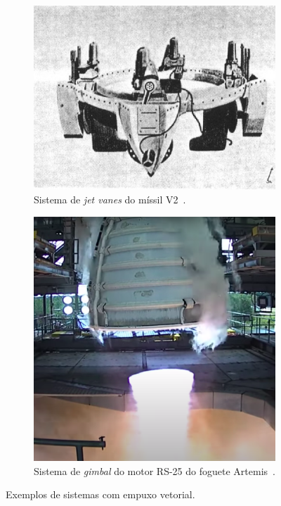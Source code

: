 \begin{figure}
    \centering
    \begin{subfigure}{.49\textwidth}
        \centering
        \includegraphics[width=.9\textwidth]{img/v2jetvanes.jpg}
        \caption{Sistema de \textit{jet vanes} do míssil V2~\cite{V2jetvanes}.}\label{fig:tvc_systems_jet_vanes}
    \end{subfigure}
    \hfill
    \begin{subfigure}{.49\textwidth}
        \centering
        \includegraphics[width=.9\textwidth]{img/engine_gimbal.png}
        \caption{Sistema de \textit{gimbal} do motor RS-25 do foguete Artemis~\cite{RS25Gimbal}.}\label{fig:tvc_systems_gimbal}
    \end{subfigure}
    \caption{Exemplos de sistemas com empuxo vetorial.}
\end{figure}

